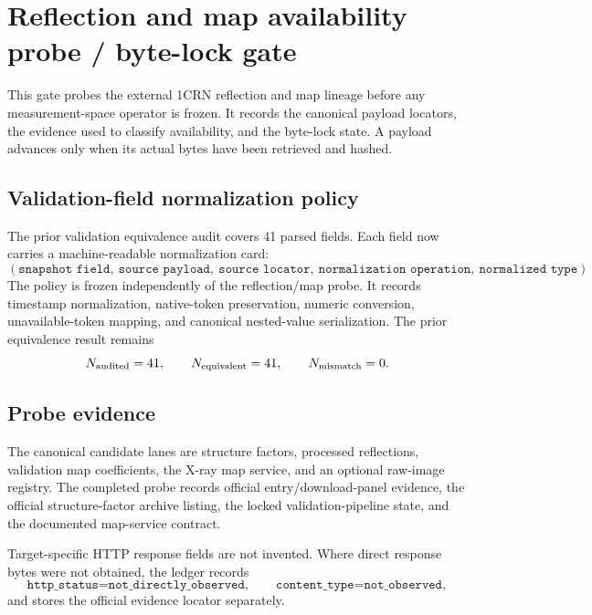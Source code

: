 \section{Reflection and map availability probe / byte-lock gate}

This gate probes the external 1CRN reflection and map lineage before any measurement-space operator is frozen. It records the canonical payload locators, the evidence used to classify availability, and the byte-lock state. A payload advances only when its actual bytes have been retrieved and hashed.

\subsection{Validation-field normalization policy}

The prior validation equivalence audit covers 41 parsed fields. Each field now carries a machine-readable normalization card:
\[
(\texttt{snapshot field},\ \texttt{source payload},\ \texttt{source locator},\ \texttt{normalization operation},\ \texttt{normalized type}).
\]
The policy is frozen independently of the reflection/map probe. It records timestamp normalization, native-token preservation, numeric conversion, unavailable-token mapping, and canonical nested-value serialization. The prior equivalence result remains
\[
N_{\rm audited}=41,
\qquad
N_{\rm equivalent}=41,
\qquad
N_{\rm mismatch}=0.
\]

\subsection{Probe evidence}

The canonical candidate lanes are structure factors, processed reflections, validation map coefficients, the X-ray map service, and an optional raw-image registry. The completed probe records official entry/download-panel evidence, the official structure-factor archive listing, the locked validation-pipeline state, and the documented map-service contract.

Target-specific HTTP response fields are not invented. Where direct response bytes were not obtained, the ledger records
\[
\texttt{http\_status=not\_directly\_observed},
\qquad
\texttt{content\_type=not\_observed},
\]
and stores the official evidence locator separately.

